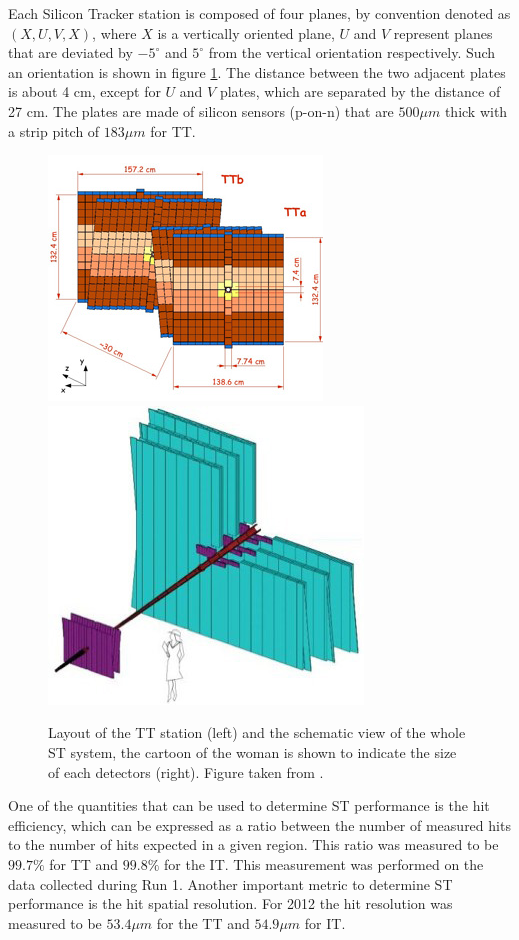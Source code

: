 Each Silicon Tracker station is composed of four planes, by convention denoted as $(X, U, V, X)$, where $X$ is a vertically oriented plane,  $U$ and $V$  represent planes that are deviated by $-5^{\circ}$ and $5^{\circ}$ from the vertical orientation respectively. Such an orientation is shown in figure \ref{fig:TT}. The distance between the two adjacent plates is about 4 cm, except for $U$ and $V$ plates, which are separated by the distance of 27 cm. 
The plates are made of silicon sensors (p-on-n)  that are $500 \mu m$ thick with a strip pitch of $183 \mu m$ for TT.  


\begin{figure}[h]
 \begin{center}
  \includegraphics[width=0.49\linewidth]{figures/TT-layout.jpg}
   \includegraphics[width=0.49\linewidth]{figures/Tracking-system-diagram-2.jpg}
   \caption{Layout of the TT station (left) and the schematic view of the whole ST system, the cartoon of the woman is shown to indicate the size of each detectors (right). Figure taken from \cite{lhcb}.  
     \label{fig:TT}}
 \end{center}
\end{figure}


One of the quantities that can be used to determine ST performance is the hit efficiency, which can be expressed as a ratio between the number of measured hits to the number of hits expected in a given region. This ratio was measured to be $99.7\%$ for TT and $99.8\%$ for the IT. This measurement was performed on the data collected during Run 1. Another important metric to determine ST performance is the hit spatial resolution.  For 2012 the hit resolution was measured to be $53.4 \mu m$ for the TT and $54.9 \mu m$ for IT.  



